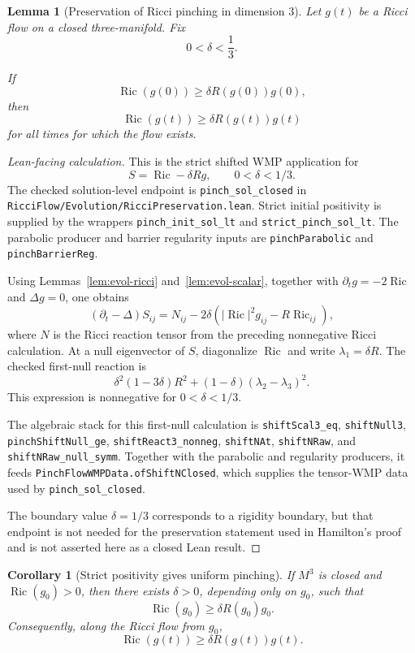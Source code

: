 \documentclass[11pt]{article}
\theoremstyle{plain}
\newtheorem{lemma}[theorem]{Lemma}
\newtheorem{corollary}[theorem]{Corollary}
\theoremstyle{definition}
\theoremstyle{remark}
\newcommand{\Ric}{\operatorname{Ric}}
\newcommand{\norm}[1]{\left|#1\right|}
\newcommand{\del}{\delta}
\newcommand{\leanref}[1]{\nolinkurl{#1}}
\newcommand{\leanfile}[1]{\nolinkurl{#1}}
\newcommand{\rffile}[1]{\leanfile{#1}}
\begin{document}
\begin{lemma}[Preservation of Ricci pinching in dimension $3$]
\label{lem:preserve-ricci-pinching}
Let $g(t)$ be a Ricci flow on a closed three-manifold. Fix
\[
0<\del<\frac13.
\]

If
\[
\Ric(g(0))\ge \del R(g(0))g(0),
\]
then
\[
\Ric(g(t))\ge \del R(g(t))g(t)
\]
for all times for which the flow exists.
\end{lemma}

\begin{proof}[Lean-facing calculation]
This is the strict shifted WMP application for
\[
S=\Ric-\delta Rg,
\qquad 0<\delta<1/3.
\]
The checked solution-level endpoint is \leanref{pinch_sol_closed} in
\rffile{RicciFlow/Evolution/RicciPreservation.lean}.  Strict initial positivity
is supplied by the wrappers \leanref{pinch_init_sol_lt} and
\leanref{strict_pinch_sol_lt}.  The parabolic producer and barrier regularity
inputs are \leanref{pinchParabolic} and \leanref{pinchBarrierReg}.

Using Lemmas~\ref{lem:evol-ricci} and~\ref{lem:evol-scalar}, together with
\(\partial_tg=-2\Ric\) and \(\Delta g=0\), one obtains
\[
(\partial_t-\Delta)S_{ij}
=
N_{ij}
-2\del\left(\norm{\Ric}^2g_{ij}-R\Ric_{ij}\right),
\]
where \(N\) is the Ricci reaction tensor from the preceding nonnegative Ricci
calculation.  At a null eigenvector of \(S\), diagonalize \(\Ric\) and write
\(\lambda_1=\delta R\).  The checked first-null reaction is
\[
  \delta^2(1-3\delta)R^2
  +(1-\delta)(\lambda_2-\lambda_3)^2.
\]
This expression is nonnegative for \(0<\delta<1/3\).

The algebraic stack for this first-null calculation is
\leanref{shiftScal3_eq}, \leanref{shiftNull3},
\leanref{pinchShiftNull_ge}, \leanref{shiftReact3_nonneg},
\leanref{shiftNAt}, \leanref{shiftNRaw}, and
\leanref{shiftNRaw_null_symm}.  Together with the parabolic and regularity
producers, it feeds \leanref{PinchFlowWMPData.ofShiftNClosed}, which supplies
the tensor-WMP data used by \leanref{pinch_sol_closed}.

The boundary value \(\delta=1/3\) corresponds to a rigidity boundary, but that
endpoint is not needed for the preservation statement used in Hamilton's proof
and is not asserted here as a closed Lean result.
\end{proof}

\begin{corollary}[Strict positivity gives uniform pinching]
\label{cor:strict-positive-gives-pinching}
If $M^3$ is closed and $\Ric(g_0)>0$, then there exists $\del>0$, depending
only on $g_0$, such that
\[
\Ric(g_0)\ge\del R(g_0)g_0.
\]
Consequently, along the Ricci flow from $g_0$,
\[
\Ric(g(t))\ge\del R(g(t))g(t).
\]
\end{corollary}
\end{document}
